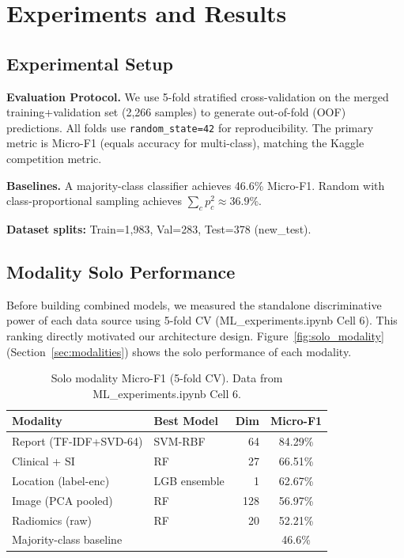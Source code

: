 \section{Experiments and Results}
\label{sec:experiments}

\subsection{Experimental Setup}

\textbf{Evaluation Protocol.} We use 5-fold stratified cross-validation on the merged training+validation set (2,266 samples) to generate out-of-fold (OOF) predictions. All folds use \texttt{random\_state=42} for reproducibility. The primary metric is Micro-F1 (equals accuracy for multi-class), matching the Kaggle competition metric.

\textbf{Baselines.} A majority-class classifier achieves 46.6\% Micro-F1. Random with class-proportional sampling achieves $\sum_c p_c^2 \approx 36.9\%$.

\textbf{Dataset splits:} Train=1,983, Val=283, Test=378 (new\_test).

\subsection{Modality Solo Performance}

Before building combined models, we measured the standalone discriminative power of each data source using 5-fold CV (ML\_experiments.ipynb Cell 6). This ranking directly motivated our architecture design. Figure~\ref{fig:solo_modality} (Section~\ref{sec:modalities}) shows the solo performance of each modality.

\begin{table}[H]
\centering
\caption{Solo modality Micro-F1 (5-fold CV). Data from ML\_experiments.ipynb Cell 6.}
\label{tab:solo_modality}
\begin{tabular}{llrc}
\toprule
\textbf{Modality} & \textbf{Best Model} & \textbf{Dim} & \textbf{Micro-F1} \\
\midrule
Report (TF-IDF+SVD-64) & SVM-RBF & 64 & 84.29\% \\
Clinical + SI & RF & 27 & 66.51\% \\
Location (label-enc) & LGB ensemble & 1 & 62.67\% \\
Image (PCA pooled) & RF & 128 & 56.97\% \\
Radiomics (raw) & RF & 20 & 52.21\% \\
\midrule
\multicolumn{3}{l}{Majority-class baseline} & 46.6\% \\
\bottomrule
\end{tabular}
\end{table}

